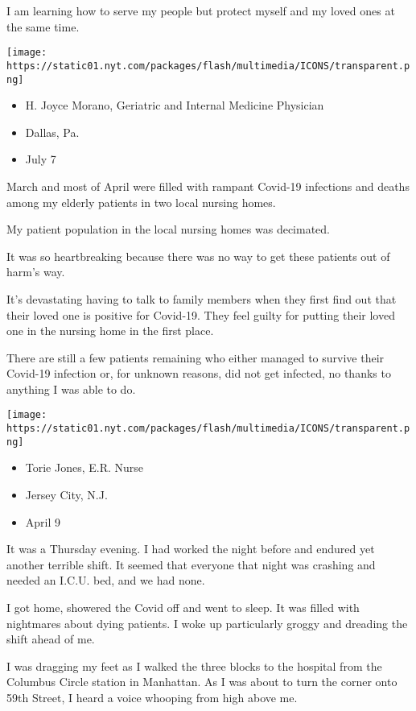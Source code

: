 I am learning how to serve my people but protect myself and my loved
ones at the same time.

\texttt{[image: https://static01.nyt.com/packages/flash/multimedia/ICONS/transparent.png]}

\begin{itemize}
\tightlist
\item
  H. Joyce Morano, Geriatric and Internal Medicine Physician
\item
  Dallas, Pa.
\item
  July 7
\end{itemize}

March and most of April were filled with rampant Covid-19 infections and
deaths among my elderly patients in two local nursing homes.

My patient population in the local nursing homes was decimated.

It was so heartbreaking because there was no way to get these patients
out of harm's way.

It's devastating having to talk to family members when they first find
out that their loved one is positive for Covid-19. They feel guilty for
putting their loved one in the nursing home in the first place.

There are still a few patients remaining who either managed to survive
their Covid-19 infection or, for unknown reasons, did not get infected,
no thanks to anything I was able to do.

\texttt{[image: https://static01.nyt.com/packages/flash/multimedia/ICONS/transparent.png]}

\begin{itemize}
\tightlist
\item
  Torie Jones, E.R. Nurse
\item
  Jersey City, N.J.
\item
  April 9
\end{itemize}

It was a Thursday evening. I had worked the night before and endured yet
another terrible shift. It seemed that everyone that night was crashing
and needed an I.C.U. bed, and we had none.

I got home, showered the Covid off and went to sleep. It was filled with
nightmares about dying patients. I woke up particularly groggy and
dreading the shift ahead of me.

I was dragging my feet as I walked the three blocks to the hospital from
the Columbus Circle station in Manhattan. As I was about to turn the
corner onto 59th Street, I heard a voice whooping from high above me.


